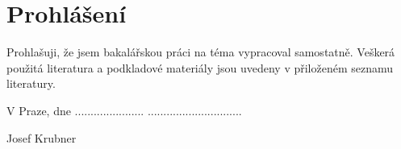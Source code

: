 \thispagestyle{empty}
        
\null
\vfill

\section*{Prohlášení}

Prohlašuji, že jsem bakalářskou práci na téma  vypracoval samostatně. Veškerá použitá literatura a podkladové materiály jsou uvedeny v přiloženém seznamu literatury.

\vspace{1cm}

V Praze, dne ...................... 
\hspace{4cm}
..............................

\hspace{9.6cm}
Josef Krubner